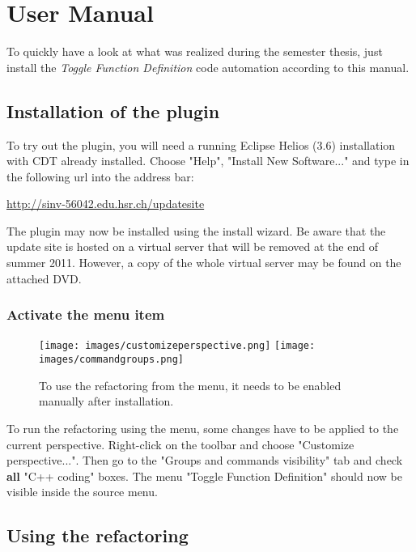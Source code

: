 \chapter{User Manual}
\thispagestyle{fancy}

To quickly have a look at what was realized during the semester thesis, just 
install the \textit{Toggle Function Definition} code automation according to 
this manual.

\section{Installation of the plugin}

To try out the plugin, you will need a running Eclipse Helios (3.6) installation with CDT already installed. Choose "Help", "Install New Software..." and type in the following url into the address bar:

\url{http://sinv-56042.edu.hsr.ch/updatesite}

The plugin may now be installed using the install wizard. Be aware that the 
update site is hosted on a virtual server that will be removed at the end of 
summer 2011. However, a copy of the whole virtual server may be found on the 
attached DVD.

\subsection{Activate the menu item}

\begin{figure}[h]
\texttt{[image: images/customizeperspective.png]}
\texttt{[image: images/commandgroups.png]}
\caption{To use the refactoring from the menu, it needs to be enabled manually 
after installation.}
\label{showMenu}
\end{figure}
\label{cmdGroup}
To run the refactoring using the menu, some changes have to be applied to the 
current perspective. Right-click on the toolbar and choose 
"Customize perspective...". Then go to the "Groups and commands visibility" tab 
and check \textbf{all} "C++ coding" boxes. The menu "Toggle Function Definition" 
should now be visible inside the source menu.

\section{Using the refactoring}

